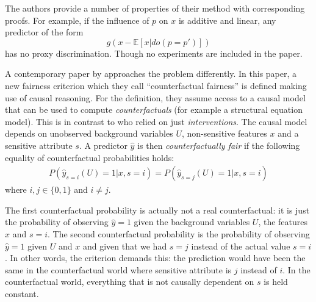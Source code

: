 The authors provide a number of properties of their method with corresponding proofs.
For example, if the influence of \(p\) on \(x\) is additive and linear,
any predictor of the form \[g(x - \mathbb{E}[x|do(p=p')])\] has no proxy discrimination.
Though no experiments are included in the paper.


A contemporary paper by \citet{kusner2017counterfactual} approaches the problem differently.
In this paper, a new fairness criterion which they call ``counterfactual fairness''
is defined making use of causal reasoning.
For the definition, they assume access to a causal model
that can be used to compute \emph{counterfactuals} (for example a structural equation model).
This is in contrast to \citet{kilbertus2017avoiding} who relied on just \emph{interventions}.
The causal model depends on unobserved background variables \(U\),
non-sensitive features \(x\) and a sensitive attribute \(s\).
A predictor \(\hat{y}\) is then \emph{counterfactually fair}
if the following equality of counterfactual probabilities holds:
\begin{align}
  \label{eq:counterfactual-fairness}
  P(\hat{y}_{s=i}(U) = 1|x, s=i)=P(\hat{y}_{s=j}(U) = 1|x, s=i)
\end{align}
where \(i, j \in \{0, 1\}\) and \(i \neq j\).

The first counterfactual probability is actually not a real counterfactual:
it is just the probability of observing \(\hat{y} = 1\)
given the background variables \(U\), the features \(x\) and \(s=i\).
The second counterfactual probability is the probability of observing \(\hat{y} = 1\)
given \(U\) and \(x\) and given that we had \(s=j\) instead of the actual value \(s=i\).
In other words, the criterion demands this:
the prediction would have been the same in the counterfactual world
where sensitive attribute is \(j\) instead of \(i\).
In the counterfactual world, everything that is not causally dependent on \(s\) is held constant.

